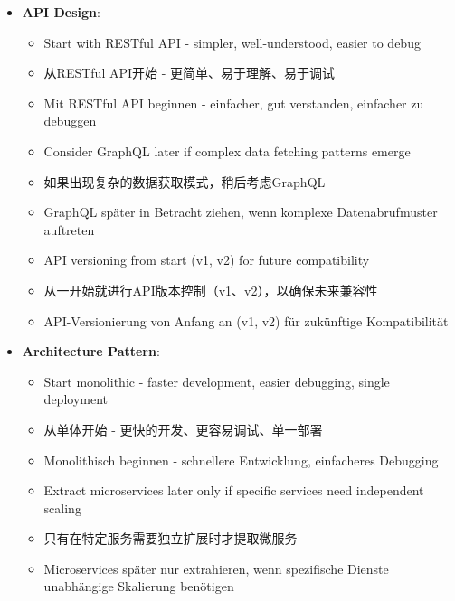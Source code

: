 \begin{itemize}
    \item \textbf{API Design}:
    \begin{itemize}
        \item Start with RESTful API - simpler, well-understood, easier to debug
        \item 从RESTful API开始 - 更简单、易于理解、易于调试
        \item Mit RESTful API beginnen - einfacher, gut verstanden, einfacher zu debuggen
        \item Consider GraphQL later if complex data fetching patterns emerge
        \item 如果出现复杂的数据获取模式，稍后考虑GraphQL
        \item GraphQL später in Betracht ziehen, wenn komplexe Datenabrufmuster auftreten
        \item API versioning from start (v1, v2) for future compatibility
        \item 从一开始就进行API版本控制（v1、v2），以确保未来兼容性
        \item API-Versionierung von Anfang an (v1, v2) für zukünftige Kompatibilität
    \end{itemize}
    
    \item \textbf{Architecture Pattern}:
    \begin{itemize}
        \item Start monolithic - faster development, easier debugging, single deployment
        \item 从单体开始 - 更快的开发、更容易调试、单一部署
        \item Monolithisch beginnen - schnellere Entwicklung, einfacheres Debugging
        \item Extract microservices later only if specific services need independent scaling
        \item 只有在特定服务需要独立扩展时才提取微服务
        \item Microservices später nur extrahieren, wenn spezifische Dienste unabhängige Skalierung benötigen
    \end{itemize}
\end{itemize}

